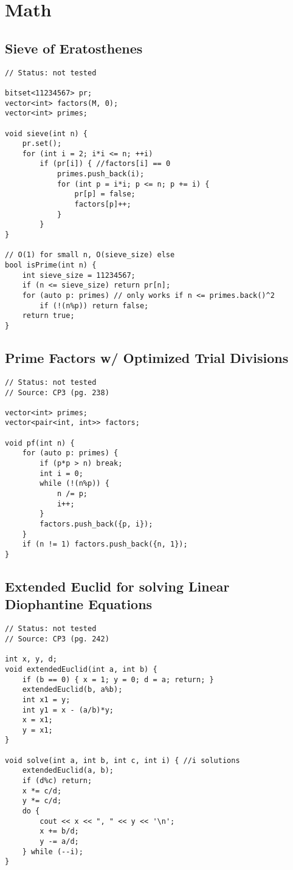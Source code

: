 \documentclass[12pt, a4paper, twoside]{article}
\begin{document}

\section{Math}

\subsection{Sieve of Eratosthenes}
\begin{lstlisting}
// Status: not tested

bitset<11234567> pr;
vector<int> factors(M, 0);
vector<int> primes;

void sieve(int n) {
	pr.set();
	for (int i = 2; i*i <= n; ++i)
		if (pr[i]) { //factors[i] == 0
			primes.push_back(i);
			for (int p = i*i; p <= n; p += i) {
				pr[p] = false;
				factors[p]++;
			}
		}
}

// O(1) for small n, O(sieve_size) else
bool isPrime(int n) {
	int sieve_size = 11234567;
	if (n <= sieve_size) return pr[n];
	for (auto p: primes) // only works if n <= primes.back()^2
		if (!(n%p)) return false;
	return true;
}
\end{lstlisting}

\subsection{Prime Factors w/ Optimized Trial Divisions}
\begin{lstlisting}
// Status: not tested
// Source: CP3 (pg. 238)

vector<int> primes;
vector<pair<int, int>> factors;

void pf(int n) {
	for (auto p: primes) {
		if (p*p > n) break;
		int i = 0;
		while (!(n%p)) {
			n /= p;
			i++;
		}
		factors.push_back({p, i});
	}
	if (n != 1) factors.push_back({n, 1});
}
\end{lstlisting}

\subsection{Extended Euclid for solving Linear Diophantine Equations}
\begin{lstlisting}
// Status: not tested
// Source: CP3 (pg. 242)

int x, y, d;
void extendedEuclid(int a, int b) {
	if (b == 0) { x = 1; y = 0; d = a; return; }
	extendedEuclid(b, a%b);
	int x1 = y;
	int y1 = x - (a/b)*y;
	x = x1;
	y = x1;
}

void solve(int a, int b, int c, int i) { //i solutions
	extendedEuclid(a, b);
	if (d%c) return;
	x *= c/d;
	y *= c/d;
	do {
		cout << x << ", " << y << '\n';
		x += b/d;
		y -= a/d;
	} while (--i);
}
\end{lstlisting}
\end{document}
